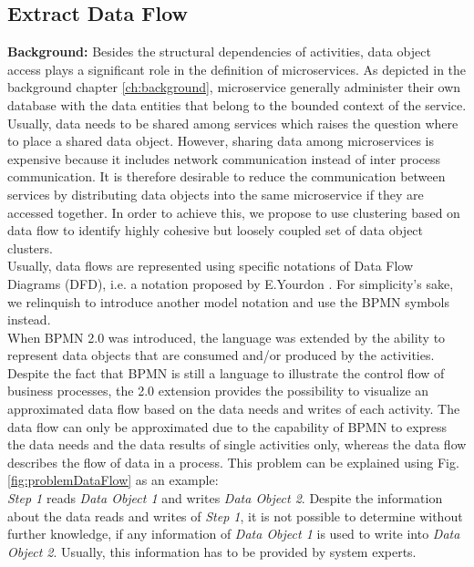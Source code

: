 \subsection{Extract Data Flow}
\label{sec:Solution:ExtractDataFlow}
\textbf{Background:} Besides the structural dependencies of activities, data object access plays a significant role in the definition of microservices. As depicted in the background chapter \ref{ch:background}, microservice generally administer their own database with the data entities that belong to the bounded context of the service. Usually, data needs to be shared among services which raises the question where to place a shared data object. However, sharing data among microservices is expensive because it includes network communication instead of inter process communication. It is therefore desirable to reduce the communication between services by distributing data objects into the same microservice if they are accessed together. In order to achieve this, we propose to use clustering based on data flow to identify highly cohesive but loosely coupled set of data object clusters. \\
Usually, data flows are represented using specific notations of Data Flow Diagrams (DFD), i.e. a notation proposed by E.Yourdon \cite{YourdonDFD}. For simplicity's sake, we relinquish to introduce another model notation and use the BPMN symbols instead. \\
When BPMN 2.0 was introduced, the language was extended by the ability to represent data objects that are consumed and/or produced by the activities. Despite the fact that BPMN is still a language to illustrate the control flow of business processes, the 2.0 extension provides the possibility to visualize an approximated data flow based on the data needs and writes of each activity. The data flow can only be approximated due to the capability of BPMN to express the data needs and the data results of single activities only, whereas the data flow describes the flow of data in a process. This problem can be explained using Fig.\ref{fig:problemDataFlow} as an example:\\
\textit{Step 1} reads \textit{Data Object 1} and writes \textit{Data Object 2}. Despite the information about the data reads and writes of \textit{Step 1}, it is not possible to determine without further knowledge, if any information of \textit{Data Object 1} is used to write into \textit{Data Object 2}. Usually, this information has to be provided by system experts.\\

